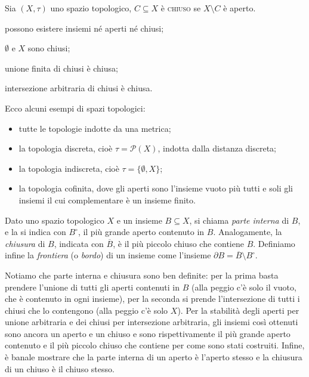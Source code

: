 \documentclass{article}
\begin{document}
\begin{defn}
    Sia $(X, \tau)$ uno spazio topologico, $C \subseteq X$ è \textsc{chiuso} se
    $X \setminus C$ è aperto.
\end{defn}

\begin{oss}
\begin{nlist}
\item possono esistere insiemi né aperti né chiusi;
\item $\emptyset$ e $X$ sono chiusi;
\item unione finita di chiusi è chiusa;
\item intersezione arbitraria di chiusi è chiusa.
\end{nlist}
\end{oss}

\begin{ex}
    Ecco alcuni esempi di spazi topologici:
    \begin{itemize}
        \item tutte le topologie indotte da una metrica;
        \item la topologia discreta, cioè $\tau=\mathcal{P}(X)$, indotta dalla
        distanza discreta;
        \item la topologia indiscreta, cioè $\tau=\{ \emptyset, X \}$;
        \item la topologia cofinita, dove gli aperti sono l'insieme vuoto più tutti e soli gli insiemi il cui complementare è un insieme finito.
    \end{itemize}
\end{ex}

\begin{defn}
	Dato uno spazio topologico $X$ e un insieme $B \subseteq X$, si chiama \textit{parte interna} di $B$, e la si indica con $B^{\circ}$, il più grande aperto contenuto in $B$. Analogamente, la \textit{chiusura} di $B$, indicata con $\overline{B}$, è il più piccolo chiuso che contiene $B$. Definiamo infine la \textit{frontiera} (o \textit{bordo}) di un insieme come l'insieme $\partial B= \overline{B} \setminus B^{\circ}$.
\end{defn}

Notiamo che parte interna e chiusura sono ben definite: per la prima basta prendere l'unione di tutti gli aperti contenuti in $B$ (alla peggio c'è solo il vuoto, che è contenuto in ogni insieme), per la seconda si prende l'intersezione di tutti i chiusi che lo contengono (alla peggio c'è solo $X$). Per la stabilità degli aperti per unione arbitraria e dei chiusi per intersezione arbitraria, gli insiemi così ottenuti sono ancora un aperto e un chiuso e sono rispettivamente il più grande aperto contenuto e il più piccolo chiuso che contiene per come sono stati costruiti. Infine, è banale mostrare che la parte interna di un aperto è l'aperto stesso e la chiusura di un chiuso è il chiuso stesso.
\end{document}
